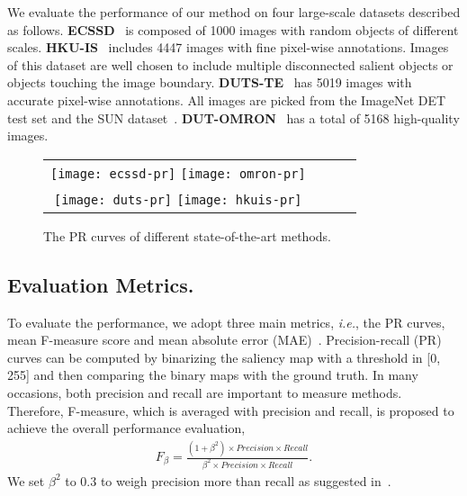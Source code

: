 \documentclass[journal]{IEEEtran}
\begin{document}
We evaluate the performance of our method on four large-scale datasets described as follows.
%
\textbf{ECSSD}~\cite{Yang2013Saliency} is composed of 1000 images with random objects of different scales.
%
%
\textbf{HKU-IS}~\cite{Li2015Visual} includes 4447 images with fine pixel-wise annotations. Images of this dataset are
well chosen to include multiple disconnected salient objects or objects touching the image boundary.
%
\textbf{DUTS-TE}~\cite{Lijun2017Learning} has 5019 images with accurate pixel-wise annotations. All images are picked from the ImageNet DET test set and the SUN dataset~\cite{Xiao2010SUN}.
%
\textbf{DUT-OMRON}~\cite{Yang2013Saliency} has a total of 5168 high-quality images.
\begin{figure}[!t]
\centering
\begin{tabular}{@{}c@{}c@{}c@{}c}
\texttt{[image: ecssd-pr]}
\texttt{[image: omron-pr]}\\
\texttt{[image: duts-pr]}
\texttt{[image: hkuis-pr]}\\
\end{tabular}
 \caption{The PR curves of different state-of-the-art methods.
}
\vspace{-4mm}
\label{Fig pr}
\end{figure}
\vspace{-2mm}
\subsection{Evaluation Metrics.}
To evaluate the performance, we adopt three main metrics, \emph{i.e.}, the PR curves, mean F-measure score and mean absolute error (MAE)~\cite{Borji2015Salient}.
%
Precision-recall (PR) curves can be computed by binarizing the saliency map with a threshold in [0, 255] and then comparing the binary maps with the ground truth.
%
In many occasions, both precision and recall are important to measure methods.
%
Therefore, F-measure, which is averaged with precision and recall, is proposed to achieve the overall performance evaluation,
\begin{align}
F_{\beta} =\frac{(1+\beta^2)\times Precision\times Recall}{\beta^2\times Precision \times Recall}.
\end{align}
We set $\beta ^2$ to 0.3 to weigh precision more than recall as suggested in~\cite{Achanta2009Frequency,Borji2015What,Wang2015Deep}.
%
\end{document}
